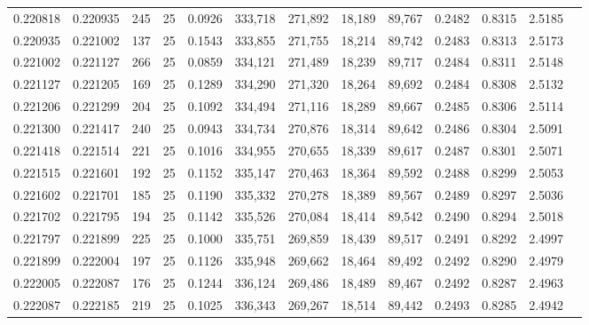 \begin{tabular}{rrrrrrrrrrrrr}
0.220818 & 0.220935 &   245 &  25 &                                     0.0926 & 333,718 & 271,892 &  18,189 &  89,767 & 0.2482 & 0.8315 & 2.5185 \\
0.220935 & 0.221002 &   137 &  25 &                                     0.1543 & 333,855 & 271,755 &  18,214 &  89,742 & 0.2483 & 0.8313 & 2.5173 \\
0.221002 & 0.221127 &   266 &  25 &                                     0.0859 & 334,121 & 271,489 &  18,239 &  89,717 & 0.2484 & 0.8311 & 2.5148 \\
0.221127 & 0.221205 &   169 &  25 &                                     0.1289 & 334,290 & 271,320 &  18,264 &  89,692 & 0.2484 & 0.8308 & 2.5132 \\
0.221206 & 0.221299 &   204 &  25 &                                     0.1092 & 334,494 & 271,116 &  18,289 &  89,667 & 0.2485 & 0.8306 & 2.5114 \\
0.221300 & 0.221417 &   240 &  25 &                                     0.0943 & 334,734 & 270,876 &  18,314 &  89,642 & 0.2486 & 0.8304 & 2.5091 \\
0.221418 & 0.221514 &   221 &  25 &                                     0.1016 & 334,955 & 270,655 &  18,339 &  89,617 & 0.2487 & 0.8301 & 2.5071 \\
0.221515 & 0.221601 &   192 &  25 &                                     0.1152 & 335,147 & 270,463 &  18,364 &  89,592 & 0.2488 & 0.8299 & 2.5053 \\
0.221602 & 0.221701 &   185 &  25 &                                     0.1190 & 335,332 & 270,278 &  18,389 &  89,567 & 0.2489 & 0.8297 & 2.5036 \\
0.221702 & 0.221795 &   194 &  25 &                                     0.1142 & 335,526 & 270,084 &  18,414 &  89,542 & 0.2490 & 0.8294 & 2.5018 \\
0.221797 & 0.221899 &   225 &  25 &                                     0.1000 & 335,751 & 269,859 &  18,439 &  89,517 & 0.2491 & 0.8292 & 2.4997 \\
0.221899 & 0.222004 &   197 &  25 &                                     0.1126 & 335,948 & 269,662 &  18,464 &  89,492 & 0.2492 & 0.8290 & 2.4979 \\
0.222005 & 0.222087 &   176 &  25 &                                     0.1244 & 336,124 & 269,486 &  18,489 &  89,467 & 0.2492 & 0.8287 & 2.4963 \\
0.222087 & 0.222185 &   219 &  25 &                                     0.1025 & 336,343 & 269,267 &  18,514 &  89,442 & 0.2493 & 0.8285 & 2.4942 \\

\end{tabular}
